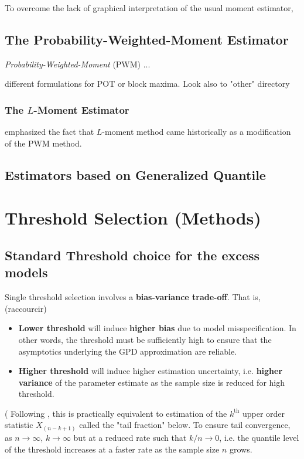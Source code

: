 To overcome the lack of graphical interpretation of the usual moment estimator, 




\subsection{The Probability-Weighted-Moment Estimator}

\emph{Probability-Weighted-Moment} (PWM)
...

different formulations for POT or block maxima. Look also to "other" directory
\cite{ribereau_skew_2016}


\subsubsection*{The $L$-Moment Estimator}
\cite{wang_lh_1997}

\cite{hosking_regional_1997} emphasized the fact that $L$-moment method came historically as a modification of the PWM method. 

\subsection{Estimators based on Generalized Quantile }




\section{Threshold Selection (Methods) }\label{stdthr}

\subsection{Standard Threshold choice for the excess models}

Single threshold selection involves a \textbf{bias-variance trade-off}. That is, (raccourcir)

\begin{itemize}
	\item \textbf{Lower threshold} will induce\textbf{ higher bias} due to model misspecification. In other words, the threshold must be sufficiently high to ensure that the asymptotics underlying the GPD approximation are reliable.
	
	\item \textbf{Higher threshold} will induce higher estimation uncertainty, i.e. \textbf{higher variance} of the parameter estimate as the sample size is reduced for high threshold. 
	
\end{itemize}
(
Following \cite{leadbetter_extremes_1983}, this is practically equivalent to estimation of the $k^{\text{th}}$ upper order statistic $X_{(n-k+1)}$
called the "tail fraction" below. To ensure tail convergence, as $n\to\infty$, $k\to\infty$ but at a reduced rate such that $k/n\to 0$, i.e. the quantile level of the threshold increases at a faster rate as the sample size $n$ grows. 

